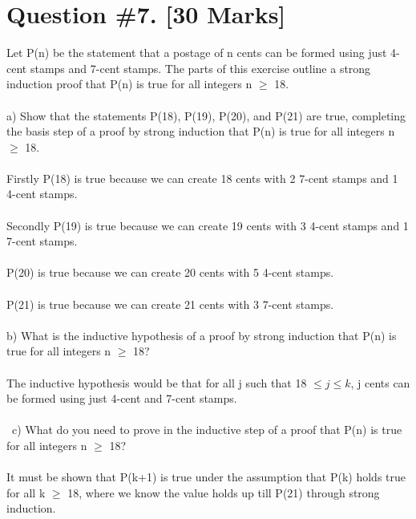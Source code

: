 \documentclass{article}
\begin{document}
\section{Question \#7. [30 Marks]}
Let P(n) be the statement that a postage of n cents can be formed using just 4-cent stamps and 7-cent stamps. The parts of this exercise outline a strong induction proof that P(n) is true for all integers n $\geq$ 18. \\\\
a) Show that the statements P(18), P(19), P(20), and P(21) are true, completing the basis step of a proof by strong induction that P(n) is true for all integers n $\geq$ 18. \\\\
Firstly P(18) is true because we can create 18 cents with 2 7-cent stamps and 1 4-cent stamps. \\\\
Secondly P(19) is true because we can create 19 cents with 3 4-cent stamps and 1 7-cent stamps.\\\\
P(20) is true because we can create 20 cents with 5 4-cent stamps. \\\\
P(21) is true because we can create 21 cents with 3 7-cent stamps. \\\\
b) What is the inductive hypothesis of a proof by strong induction that P(n) is true for all integers n $\geq$ 18? \\\\
The inductive hypothesis would be that for all j such that 18 $\leq j \leq k$, j cents can be formed using just 4-cent and 7-cent stamps. \\\\\
c) What do you need to prove in the inductive step of a proof that P(n) is true for all integers n $\geq$ 18? \\\\
It must be shown that P(k+1) is true under the assumption that P(k) holds true for all k $\geq$ 18, where we know the value holds up till P(21) through strong induction.
\newpage
\end{document}
